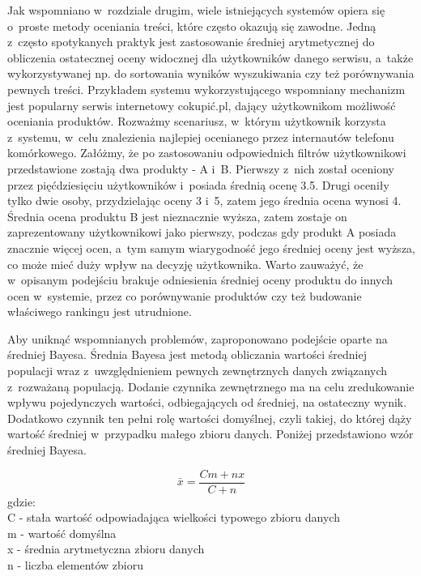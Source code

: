 Jak wspomniano w~rozdziale drugim, wiele istniejących systemów opiera się o~proste metody oceniania treści, które często okazują się zawodne. Jedną z~często spotykanych praktyk jest zastosowanie średniej arytmetycznej do obliczenia ostatecznej oceny widocznej dla użytkowników danego serwisu, a~także wykorzystywanej np. do sortowania wyników wyszukiwania czy też porównywania pewnych treści. Przykładem systemu wykorzystującego wspomniany mechanizm jest popularny serwis internetowy cokupić.pl, dający użytkownikom możliwość oceniania produktów. Rozważmy scenariusz, w~którym użytkownik korzysta z~systemu, w~celu znalezienia najlepiej ocenianego przez internautów telefonu komórkowego. Załóżmy, że po zastosowaniu odpowiednich filtrów użytkownikowi przedstawione zostają dwa produkty - A i~B. Pierwszy z~nich został oceniony przez pięćdziesięciu użytkowników i~posiada średnią ocenę 3.5. Drugi oceniły tylko dwie osoby, przydzielając oceny 3 i~5, zatem jego średnia ocena wynosi 4. Średnia ocena produktu B jest nieznacznie wyższa, zatem zostaje on zaprezentowany użytkownikowi jako pierwszy, podczas gdy produkt A posiada znacznie więcej ocen, a~tym samym wiarygodność jego średniej oceny jest wyższa, co może mieć duży wpływ na decyzję użytkownika. Warto zauważyć, że w~opisanym podejściu brakuje odniesienia średniej oceny produktu do innych ocen w~systemie, przez co porównywanie produktów czy też budowanie właściwego rankingu jest utrudnione.

Aby uniknąć wspomnianych problemów, zaproponowano podejście oparte na średniej Bayesa. Średnia Bayesa jest metodą obliczania wartości średniej populacji wraz z~uwzględnieniem pewnych zewnętrznych danych związanych z~rozważaną populacją. Dodanie czynnika zewnętrznego ma na celu zredukowanie wpływu pojedynczych wartości, odbiegających od średniej, na ostateczny wynik. Dodatkowo czynnik ten pełni rolę wartości domyślnej, czyli takiej, do której dąży wartość średniej w~przypadku małego zbioru danych.\cite{bayesWiki} Poniżej przedstawiono wzór średniej Bayesa.

\begin{equation}
\bar{x}=\frac{Cm+nx}{C+n}
\end{equation}
gdzie:\\
C - stała wartość odpowiadająca wielkości typowego zbioru danych\\
m - wartość domyślna\\
x - średnia arytmetyczna zbioru danych\\
n - liczba elementów zbioru\\


